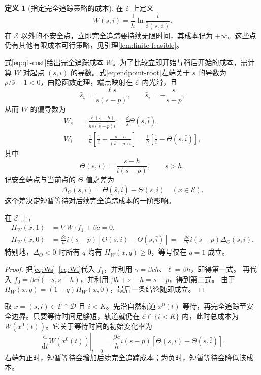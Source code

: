 \documentclass[lang=cn,a4paper,newtx]{elegantpaper}
\theoremstyle{plain}
\theoremstyle{definition}
\newtheorem{paperdefinition}[theorem]{定义}
\newcommand{\Dcal}{\mathcal D}
\newcommand{\dd}{\,\mathrm d}
\begin{document}
\begin{paperdefinition}[指定完全追踪策略的成本]
\label{def:W}
在 $\mathcal E$ 上定义
\begin{equation}
W(s,i)=\frac1h\ln\frac{i}{\bar i(s,i)}.
\label{eq:W}
\end{equation}
在 $\mathcal E$ 以外的不安全点，立即完全追踪要持续无限时间，其成本记为 $+\infty$。这些点仍有其他有限成本可行策略，见引理\ref{lem:finite-feasible}。
\end{paperdefinition}
式\eqref{eq:q1-cost}给出完全追踪成本 $W$。为了比较立即开始与稍后开始的成本，需计算 $W$ 对起点 $(s,i)$ 的导数。式\eqref{eq:endpoint-root}左端关于 $\bar s$ 的导数为 $p/\bar s-1<0$，由隐函数定理，端点映射在 $\mathcal E$ 内光滑，且
\begin{equation}
\bar s_s=\frac{\ell\bar s}{s(\bar s-p)},\qquad
\bar s_i=-\frac{\bar s}{\bar s-p},
\label{eq:endpoint-derivatives}
\end{equation}
从而 $W$ 的偏导数为
\begin{align}
W_s&=\frac{\ell(\bar s-h)}{hs(\bar s-p)\bar i}
=\frac \beta s\Theta(\bar s,\bar i),\label{eq:Ws}\\
W_i&=\frac1h\left[\frac1i-\frac{\bar s-h}{(\bar s-p)\bar i}\right]
=\frac1h\left[\frac1i-\Theta(\bar s,\bar i)\right],\label{eq:Wi}
\end{align}
其中
\begin{equation}
\Theta(s,i)=\frac{s-h}{i(s-p)},\qquad s>h,
\label{eq:Theta}
\end{equation}
记安全端点与当前点的 $\Theta$ 值之差为
\begin{equation}
\Delta_\Theta(s,i)=\Theta(\bar s,\bar i)-\Theta(s,i)\quad(x\in\mathcal E).
\label{eq:D-residual}
\end{equation}
这个差决定短暂等待对后续完全追踪成本的一阶影响。

\begin{proposition}
\label{prop:W-HJB}
在 $\mathcal E$ 上，
\begin{align}
H_W(x,1)&=\nabla W\cdot f_1+\beta c=0,\label{eq:H1-zero}\\
H_W(x,0)&=\frac{\beta c}{h}i(s-p)[\Theta(s,i)-\Theta(\bar s,\bar i)]
=-\frac{\beta c}{h}i(s-p)\Delta_\Theta(s,i).\label{eq:H0-theta}
\end{align}
特别地，$\Delta_\Theta<0$ 时所有 $q$ 均有 $H_W(x,q)\ge0$，等号仅在 $q=1$ 成立。
\end{proposition}
\begin{proof}
把\eqref{eq:Ws}--\eqref{eq:Wi}代入 $f_1$，并利用 $\gamma=\beta ch$、$\ell=\beta h$，即得第一式。
再代入 $f_0=\beta ci(-s,s-h)$，并利用 $\beta h+s-h=s-p$，得到第二式。
由于 $H_W(x,q)=(1-q)H_W(x,0)$，最后一条结论随即成立。
\end{proof}
取 $x=(s,i)\in\mathcal E\cap\Dcal$ 且 $i<K$。先沿自然轨道 $x^0(t)$ 等待，再完全追踪至安全边界。只要等待时间足够短，轨道就仍在 $\mathcal E\cap\{i<K\}$ 内，此时总成本为 $W(x^0(t))$。它关于等待时间的初始变化率为
\begin{equation}
 \left.\frac{\dd}{\dd t}W(x^0(t))\right|_{t=0}
 =\frac{\beta c}{h}i(s-p)
 [\Theta(s,i)-\Theta(\bar s,\bar i)].
 \label{eq:waiting-marginal-cost}
\end{equation}
右端为正时，短暂等待会增加后续完全追踪成本；为负时，短暂等待会降低该成本。
\end{document}
